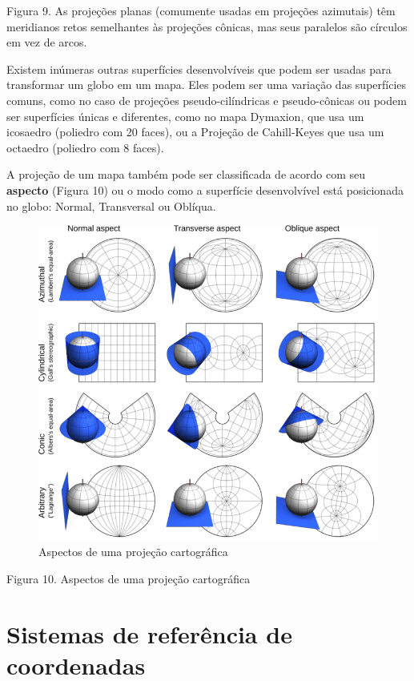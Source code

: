 \documentclass[
]{krantz}
\begin{document}
Figura 9. As projeções planas (comumente usadas em projeções azimutais) têm meridianos retos semelhantes às projeções cônicas, mas seus paralelos são círculos em vez de arcos.

Existem inúmeras outras superfícies desenvolvíveis que podem ser usadas para transformar um globo em um mapa. Eles podem ser uma variação das superfícies comuns, como no caso de projeções pseudo-cilíndricas e pseudo-cônicas ou podem ser superfícies únicas e diferentes, como no mapa Dymaxion, que usa um icosaedro (poliedro com 20 faces), ou a Projeção de Cahill-Keyes que usa um octaedro (poliedro com 8 faces).

A projeção de um mapa também pode ser classificada de acordo com seu \textbf{aspecto} (Figura 10) ou o modo como a superfície desenvolvível está posicionada no globo: Normal, Transversal ou Oblíqua.

\begin{figure}
\centering
\includegraphics{media/modulo0/aspects.png}
\caption{Aspectos de uma projeção cartográfica}
\end{figure}

Figura 10. Aspectos de uma projeção cartográfica

\hypertarget{sistemas-de-referuxeancia-de-coordenadas}{%
\section{Sistemas de referência de coordenadas}\label{sistemas-de-referuxeancia-de-coordenadas}}
\end{document}
